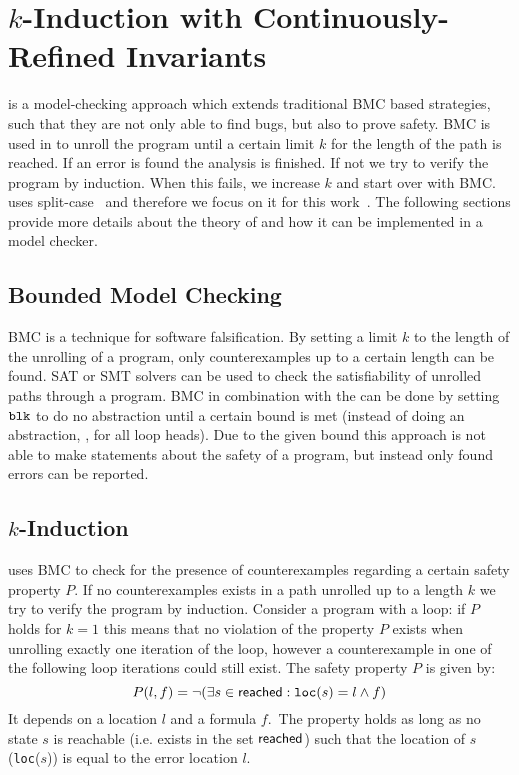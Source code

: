 \section{$k$-Induction with Continuously-Refined Invariants}\label{title:kind}
\Kinduction{} is a model-checking approach which extends traditional \ac{BMC} based strategies, such that they are not only able to find bugs, but also to prove safety.
\ac{BMC} is used in \Kinduction{} to unroll the program until a certain limit $k$ for the length of the path is reached. If an error is found the analysis is finished. If not
we try to verify the program by induction. When this fails, we increase $k$ and start over with \ac{BMC}.
\CPAchecker{} uses split-case \Kinduction{}\, and therefore we focus on it for this work~\cite{Beyer:KInduction}. The following sections provide more details about the theory of \Kinduction{} and how it can be implemented in a model checker.

\subsection{Bounded Model Checking}\label{title:bmc}
\ac{BMC} is a technique for software falsification. By setting a limit $k$ to the length of the unrolling of a program, only counterexamples up to a certain length can be found. SAT or \ac{SMT} solvers can be used to check the satisfiability of unrolled paths through a program. \ac{BMC} in combination with the \PredicateCPA{} can be done by setting $\mathtt{blk}{}$ to do no abstraction until a certain bound is met (instead of doing an abstraction, \eg, for all loop heads). Due to the given bound this approach is not able to make statements about the safety of a program, but instead only found errors can be reported.

\subsection{$k$-Induction}
\Kinduction{} uses \ac{BMC} to check for the presence of counterexamples regarding a certain safety property $P$. If no counterexamples exists in a path unrolled
up to a length $k$ we try to verify the program by induction.
Consider a program with a loop: if $P$ holds for $k = 1$ this means that no violation of the property $P$ exists when unrolling exactly one iteration of the loop,
however a counterexample in one of the following loop iterations could still exist. The safety property $P$ is given by:
\begin{displaymath}
P(l,f) = \neg (\exists s \in \operatorname{\mathsf{reached}}: \mathtt{loc}(s) = l \land f)
\end{displaymath}
It depends on a location $l$ and a formula $f$.\,
The property holds as long as no state $s$ is reachable (i.e. exists in the set $\operatorname{\mathsf{reached}}$)
such that the location of $s$ (\texttt{loc}($s$)) is equal to the error location $l$.

